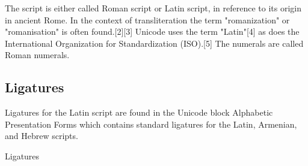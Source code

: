 The script is either called Roman script or Latin script, in reference to its origin in ancient Rome. In the context of transliteration the term "romanization" or "romanisation" is often found.[2][3] Unicode uses the term "Latin"[4] as does the International Organization for Standardization (ISO).[5] The numerals are called Roman numerals.


\subsection{Ligatures}

\newfontfamily{}

Ligatures for the Latin script are found in the Unicode block Alphabetic Presentation Forms which contains standard ligatures for the Latin, Armenian, and Hebrew scripts.

\begin{scriptexample}[]{Ligatures}
\end{scriptexample}














